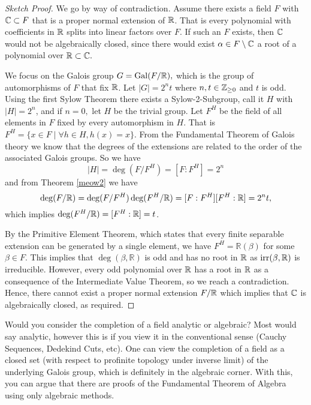 

\begin{proof}[Sketch Proof]
    We go by way of contradiction. Assume there exists a field $F$ with $\mathbb C \subset F$ that is a proper normal extension of $\mathbb R$. That is every polynomial with coefficients in $\mathbb R$ splits into linear factors over $F$. 
    If such an $F$ exists, then $\mathbb C$ would not be algebraically closed, since there would exist $\alpha \in F\setminus \mathbb C$ a root of a polynomial over $\mathbb R \subset \mathbb C.$
    
    We focus on the Galois group $G = \operatorname{Gal}(F/\mathbb R),$ which is the group of automorphisms of $F$ that fix $\mathbb R$. Let $|G| = 2^n t$ where $n,t \in \mathbb Z_{\geq 0}$ and $t$ is odd. Using the first Sylow Theorem there exists a Sylow-2-Subgroup, call it $H$ with $|H| = 2^n$, and if $n=0,$ let $H$ be the trivial group. Let $F^H$ be the field of all elements in $F$ fixed by every automorphism in $H$. That is $F^H = \{x \in F \mid \forall h \in H, h(x) = x\}$. From the Fundamental Theorem of Galois theory we know that the degrees of the extensions are related to the order of the associated Galois groups. So we have 
    $$|H| = \deg(F/F^H) = [F : F^H] = 2^n$$ and from Theorem \ref{meow2} we have
    $$
    \deg(F/\mathbb R) = \deg(F/F^H)\deg(F^H/\mathbb R) = [F : F^H][F^H : \mathbb R] = 2^n t,
    $$
    which implies $\deg(F^H/\mathbb R)=[F^H : \mathbb R]=t$. 
    
    By the Primitive Element Theorem, which states that every finite separable extension can be generated by a single element, we have $F^H = \mathbb{R}(\beta)$ for some $\beta \in F$. This implies that $\operatorname{deg}(\beta, \mathbb{R})$ is odd and has no root in $\mathbb R$ as $\operatorname{irr}(\beta, \mathbb R)$ is irreducible. However, every odd polynomial over $\mathbb R$ has a root in $\mathbb R$ as a consequence of the Intermediate Value Theorem, so we reach a contradiction. Hence, there cannot exist a proper normal extension $F/\mathbb R$ which implies that $\mathbb C$ is algebraically closed, as required.
\end{proof}

\begin{remark}
    Would you consider the completion of a field analytic or algebraic? Most would say analytic, however this is if you view it in the conventional sense (Cauchy Sequences, Dedekind Cuts, etc). One can view the completion of a field as a closed set (with respect to profinite topology under inverse limit) of the underlying Galois group, which is definitely in the algebraic corner. With this, you can argue that there are proofs of the Fundamental Theorem of Algebra using only algebraic methods.
\end{remark} 



